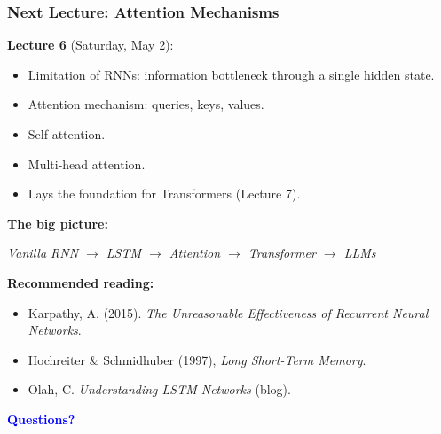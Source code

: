 \documentclass[notes,11pt, aspectratio=169]{beamer}
\begin{document}
\begin{frame}
\frametitle{Next Lecture: Attention Mechanisms}

\textbf{Lecture 6} (Saturday, May 2):
\begin{itemize}
    \item Limitation of RNNs: information bottleneck through a single hidden state.
    \item Attention mechanism: queries, keys, values.
    \item Self-attention.
    \item Multi-head attention.
    \item Lays the foundation for Transformers (Lecture 7).
\end{itemize}

\vspace{6pt}
\textbf{The big picture:}
\begin{center}
\textit{Vanilla RNN $\to$ LSTM $\to$ Attention $\to$ Transformer $\to$ LLMs}
\end{center}

\textbf{Recommended reading:}
\begin{itemize}
    \item Karpathy, A. (2015). \textit{The Unreasonable Effectiveness of Recurrent Neural Networks}.
    \item Hochreiter \& Schmidhuber (1997), \textit{Long Short-Term Memory}.
    \item Olah, C. \textit{Understanding LSTM Networks} (blog).
\end{itemize}

\vspace{4pt}
\begin{center}
\Large \textcolor{blue}{\textbf{Questions?}}
\end{center}
\end{frame}
\end{document}
